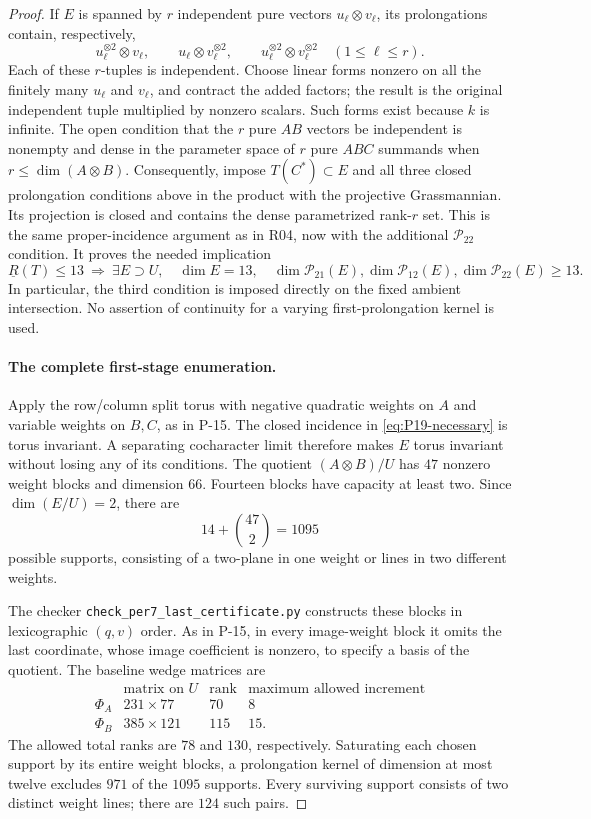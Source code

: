\begin{proof}
If $E$ is spanned by $r$ independent pure vectors
$u_\ell\otimes v_\ell$, its prolongations contain, respectively,
\[
 u_\ell^{\otimes2}\otimes v_\ell,\qquad
 u_\ell\otimes v_\ell^{\otimes2},\qquad
 u_\ell^{\otimes2}\otimes v_\ell^{\otimes2}
 \quad(1\le\ell\le r).
\]
Each of these $r$-tuples is independent.  Choose linear forms nonzero
on all the finitely many $u_\ell$ and $v_\ell$, and contract the added
factors; the result is the original independent tuple multiplied by
nonzero scalars.  Such forms exist because $k$ is infinite.
The open condition that the $r$ pure $AB$ vectors be independent is
nonempty and dense in the parameter space of $r$ pure $ABC$ summands
when $r\le\dim(A\otimes B)$.
Consequently, impose $T(C^*)\subset E$ and all three closed
prolongation conditions above in the product with the projective
Grassmannian.  Its projection is closed and contains the dense
parametrized rank-$r$ set.  This is the same proper-incidence argument
as in R04, now with the additional $\mathcal P_{22}$ condition.
It proves the needed implication
\begin{equation}
 \underline R(T)\le13\ \Longrightarrow\
 \exists E\supset U,\quad \dim E=13,\quad
 \dim\mathcal P_{21}(E),\dim\mathcal P_{12}(E),
       \dim\mathcal P_{22}(E)\ge13.
 \label{eq:P19-necessary}
\end{equation}
In particular, the third condition is imposed directly on the fixed
ambient intersection.  No assertion of continuity for a varying
first-prolongation kernel is used.

\paragraph{The complete first-stage enumeration.}
Apply the row/column split torus with negative quadratic weights on
$A$ and variable weights on $B,C$, as in P-15.  The closed incidence
in \eqref{eq:P19-necessary} is torus invariant.  A separating
cocharacter limit therefore makes $E$ torus invariant without losing
any of its conditions.  The quotient $(A\otimes B)/U$ has $47$
nonzero weight blocks and dimension $66$.  Fourteen blocks have
capacity at least two.  Since $\dim(E/U)=2$, there are
\[
 14+\binom{47}{2}=1095
\]
possible supports, consisting of a two-plane in one weight or lines
in two different weights.

The checker \texttt{check\_per7\_last\_certificate.py} constructs these
blocks in lexicographic $(q,v)$ order.  As in P-15, in every image-weight
block it omits the last coordinate, whose image coefficient is nonzero,
to specify a basis of the quotient.  The baseline wedge matrices are
\[
\begin{array}{c|c|c|c}
 &\text{matrix on }U&\text{rank}&\text{maximum allowed increment}\\\hline
 \Phi_A&231\times77&70&8\\
 \Phi_B&385\times121&115&15.
\end{array}
\]
The allowed total ranks are $78$ and $130$, respectively.
Saturating each chosen support by its entire weight blocks, a
prolongation kernel of dimension at most twelve excludes $971$ of the
$1095$ supports.  Every surviving support consists of two distinct
weight lines; there are $124$ such pairs.


\end{proof}
